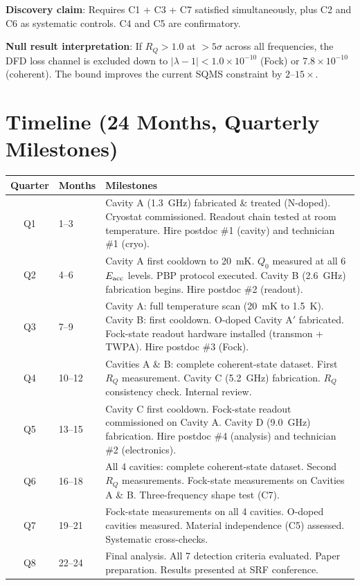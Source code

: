 \documentclass[11pt]{article}
\newcommand{\ee}[1]{\times 10^{#1}}
\newcommand{\lbone}{|\lambda - 1|}
\begin{document}
\textbf{Discovery claim}: Requires C1 + C3 + C7 satisfied simultaneously,
plus C2 and C6 as systematic controls. C4 and C5 are confirmatory.

\textbf{Null result interpretation}: If $R_Q > 1.0$ at $> 5\sigma$ across
all frequencies, the DFD loss channel is excluded down to $\lbone <
1.0\ee{-10}$ (Fock) or $7.8\ee{-10}$ (coherent). The bound improves
the current SQMS constraint by $2$--$15\times$.


\section{Timeline (24 Months, Quarterly Milestones)}

\begin{center}
\renewcommand{\arraystretch}{1.2}
\begin{tabular}{@{}clp{8cm}@{}}
\toprule
\textbf{Quarter} & \textbf{Months} & \textbf{Milestones} \\
\midrule
Q1 & 1--3 & Cavity A (1.3~GHz) fabricated \& treated (N-doped).
  Cryostat commissioned. Readout chain tested at room temperature.
  Hire postdoc \#1 (cavity) and technician \#1 (cryo). \\
Q2 & 4--6 & Cavity A first cooldown to 20~mK. $Q_0$ measured at all 6
  $E_{\rm acc}$ levels. PBP protocol executed. Cavity B (2.6~GHz)
  fabrication begins. Hire postdoc \#2 (readout). \\
Q3 & 7--9 & Cavity A: full temperature scan (20~mK to 1.5~K). Cavity B:
  first cooldown. O-doped Cavity A$'$ fabricated. Fock-state readout
  hardware installed (transmon + TWPA). Hire postdoc \#3 (Fock). \\
Q4 & 10--12 & Cavities A \& B: complete coherent-state dataset. First
  $R_Q$ measurement. Cavity C (5.2~GHz) fabrication. $R_Q$ consistency
  check. Internal review. \\
Q5 & 13--15 & Cavity C first cooldown. Fock-state readout commissioned
  on Cavity A. Cavity D (9.0~GHz) fabrication. Hire postdoc \#4
  (analysis) and technician \#2 (electronics). \\
Q6 & 16--18 & All 4 cavities: complete coherent-state dataset. Second
  $R_Q$ measurements. Fock-state measurements on Cavities A \& B.
  Three-frequency shape test (C7). \\
Q7 & 19--21 & Fock-state measurements on all 4 cavities. O-doped
  cavities measured. Material independence (C5) assessed. Systematic
  cross-checks. \\
Q8 & 22--24 & Final analysis. All 7 detection criteria evaluated.
  Paper preparation. Results presented at SRF conference. \\
\bottomrule
\end{tabular}
\end{center}
\end{document}
